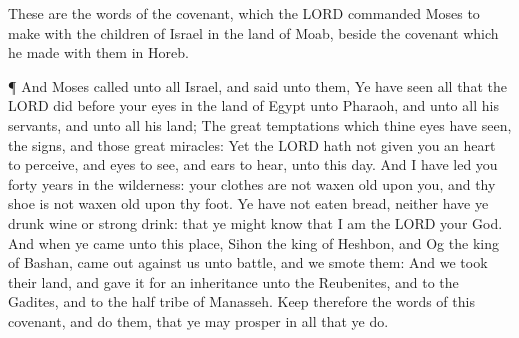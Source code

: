  These are the words of the covenant, which the LORD
commanded Moses to make with the children of Israel in the land of Moab,
beside the covenant which he made with them in Horeb.

 ¶ And Moses called unto all Israel, and said unto them, Ye
have seen all that the LORD did before your eyes in the land of Egypt
unto Pharaoh, and unto all his servants, and unto all his land;
 The great temptations which thine eyes have seen, the
signs, and those great miracles:  Yet the LORD hath not
given you an heart to perceive, and eyes to see, and ears to hear, unto
this day.  And I have led you forty years in the wilderness:
your clothes are not waxen old upon you, and thy shoe is not waxen old
upon thy foot.  Ye have not eaten bread, neither have ye
drunk wine or strong drink: that ye might know that I am the LORD your
God.  And when ye came unto this place, Sihon the king of
Heshbon, and Og the king of Bashan, came out against us unto battle, and
we smote them:  And we took their land, and gave it for an
inheritance unto the Reubenites, and to the Gadites, and to the half
tribe of Manasseh.  Keep therefore the words of this
covenant, and do them, that ye may prosper in all that ye do.

